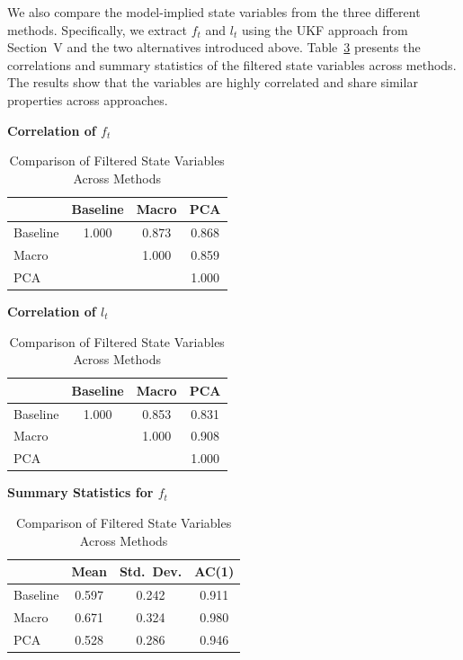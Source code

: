 We also compare the model-implied state variables from the three different methods. Specifically, we extract $f_t$ and $l_t$ using the UKF approach from Section~V and the two alternatives introduced above. Table~\ref{tab:filtered_state_vars} presents the correlations and summary statistics of the filtered state variables across methods. The results show that the variables are highly correlated and share similar properties across approaches.


\begin{table}[H]
    \centering
    \caption{Comparison of Filtered State Variables Across Methods}
    \label{tab:filtered_state_vars}
    \vspace{0.5em}
    
    \textbf{Correlation of $f_t$} \\
    \begin{tabular}{lccc}
        \toprule
        & \textbf{Baseline} & \textbf{Macro} & \textbf{PCA} \\
        \midrule
        Baseline & 1.000 & 0.873 & 0.868 \\
        Macro    &       & 1.000 & 0.859 \\
        PCA      &       &       & 1.000 \\
        \bottomrule
    \end{tabular}

    \vspace{1em}
    
    \textbf{Correlation of $l_t$} \\
    \begin{tabular}{lccc}
        \toprule
        & \textbf{Baseline} & \textbf{Macro} & \textbf{PCA} \\
        \midrule
        Baseline & 1.000 & 0.853 & 0.831 \\
        Macro    &       & 1.000 & 0.908 \\
        PCA      &       &       & 1.000 \\
        \bottomrule
    \end{tabular}

    \vspace{1em}
    
    \textbf{Summary Statistics for $f_t$} \\
    \begin{tabular}{lccc}
        \toprule
        & \textbf{Mean} & \textbf{Std.\ Dev.} & \textbf{AC(1)} \\
        \midrule
        Baseline & 0.597 & 0.242 & 0.911 \\
        Macro    & 0.671 & 0.324 & 0.980 \\
        PCA      & 0.528 & 0.286 & 0.946 \\
        \bottomrule
    \end{tabular}


\end{table}
